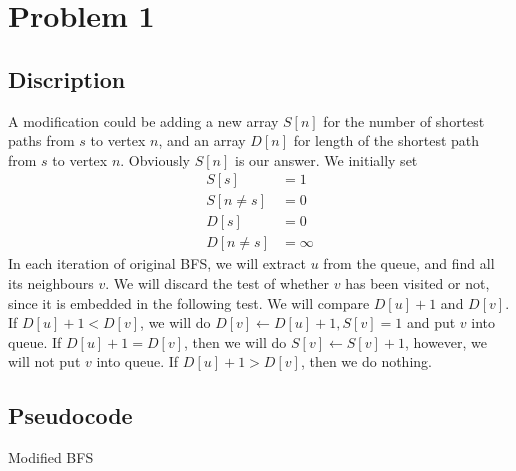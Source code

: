 \documentclass{report}
\begin{document}
    \section*{Problem 1}
    \subsection*{Discription}
    A modification could be adding a new array $S[n]$ for the number of shortest paths 
    from $s$ to vertex $n$, and an array $D[n]$ for length of the shortest path from 
    $s$ to vertex $n$. Obviously $S[n]$ is our answer. We initially set 
    \begin{align*}
        S[s] &= 1 \\
        S[n \neq s] &= 0 \\
        D[s] &= 0 \\
        D[n \neq s] &= \infty
    \end{align*}
    In each iteration of original BFS, we will extract $u$ from the queue, and find
    all its neighbours $v$. We will discard the test of whether $v$ has been visited
    or not, since it is embedded in the following test.
    We will compare $D[u]+1$ and $D[v]$. If $D[u] + 1 < D[v]$, we will do 
    $D[v] \gets D[u] + 1, S[v] = 1$ and put $v$ into queue. 
    If $D[u]+1 = D[v]$, then we will do $S[v] \gets S[v] + 1$, however,
    we will not put $v$ into queue. If $D[u] + 1 > D[v]$, then we do nothing.

    \subsection*{Pseudocode}
    \begin{algorithm}
        \caption{Modified BFS}
        \begin{algorithmic}[1]
                     
                     
                    \EndIf{}
                \EndFor{}
            \EndWhile{}
        \end{algorithmic}
    \end{algorithm}
\end{document}
